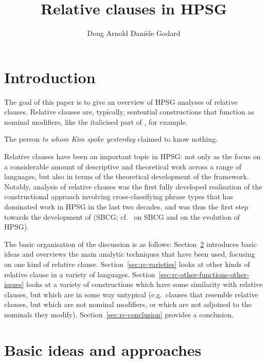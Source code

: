\documentclass[output=paper
 	        ,biblatex
                ,babelshorthands
                ,newtxmath
                ,draftmode
                ,colorlinks, citecolor=brown
]{langscibook}
\title{Relative clauses in HPSG}
\author{%
 Doug Arnold\affiliation{University of Essex}\lastand 
 Danièle Godard\affiliation{Université de Paris, CNRS}
}
\begin{document}
\maketitle
\label{chap-relative-clauses}

\section{Introduction}
\label{sec:rc-introduction}

The goal of this paper is to give an overview of HPSG analyses of
relative clauses. Relative clauses are, typically, sentential constructions that function as nominal
modifiers, like the italicised part of , for example.
\begin{exe}\ex
    \label{x:rc-1} The person \emph{to whom Kim spoke yesterday} claimed to know nothing.
\end{exe}
Relative clauses have been an important topic in HPSG: not only as the focus on a
considerable amount of descriptive and theoretical work across a range of languages, but
also in terms of the theoretical development of the framework. Notably, 
analysis of  relative clauses was the first fully developed realisation of the
constructional approach involving cross-classifying phrase types that has dominated work
in HPSG in the last two decades, and was thus the first step towards the development of
 (SBCG; cf.\ 
on SBCG and  on the evolution of HPSG).

The basic organisation of the discussion is as follows: Section~\ref{sec:rc-approaches}
introduces basic ideas and overviews the main analytic techniques that have been used, focusing
on one kind of relative clause. Section~\ref{sec:rc-varieties} looks at other kinds of
relative clause in a variety of languages. Section~\ref{sec:rc-other-functions-other-issues}
looks at a variety of constructions which have some similarity with relative clauses, but which are in
some way untypical (e.g.\ clauses that resemble relative clauses, but which are not
nominal modifiers, or which are not adjoined to the nominals they
modify). Section~\ref{sec:rc-conclusion} provides a conclusion.

\section{Basic ideas and approaches}
\label{sec:rc-approaches}
\end{document}
